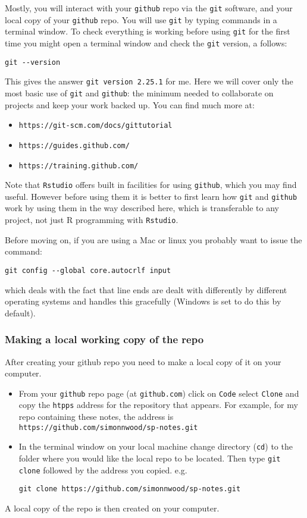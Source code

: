 \documentclass[10pt] {article}
\theoremstyle{definition}
\begin{document}
Mostly, you will interact with your {\tt github} repo via the {\tt git} software, and your local copy of your {\tt github} repo. You will use {\tt git} by typing commands in a terminal window. To check everything is working before using {\tt git} for the first time you might open a terminal window and check the {\tt git} version, a follows:
\begin{lstlisting}
git --version
\end{lstlisting}
This gives the answer \lstinline+git version 2.25.1+ for me. Here we will cover only the most basic use of {\tt git} and {\tt github}: the minimum needed to collaborate on projects and keep your work backed up. You can find much more at:
\begin{itemize}
\item \lstinline+https://git-scm.com/docs/gittutorial+
\item \lstinline+https://guides.github.com/+
\item \lstinline+https://training.github.com/+
\end{itemize}
Note that {\tt Rstudio} offers built in facilities for using {\tt github}, which you may find useful. However before using them it is better to first learn how {\tt git} and {\tt github} work by using them in the way described here, which is transferable to any project, not just R programming with {\tt Rstudio}.  

Before moving on, if you are using a Mac or linux you probably want to issue the command:
\begin{lstlisting}
git config --global core.autocrlf input
\end{lstlisting}
which deals with the fact that line ends are dealt with differently by different operating systems and handles this gracefully (Windows is set to do this by default).

\subsubsection{Making a local working copy of the repo}

After creating your github repo you need to make a local copy of it on your computer. 
\begin{itemize}
\item From your {\tt github} repo page (at {\tt github.com}) click on {\tt Code} select {\tt Clone} and copy the {\tt htpps} address for the repository that appears. For example, for my repo containing these notes, the address is \lstinline+https://github.com/simonnwood/sp-notes.git+
\item In the terminal window on your local machine change directory ({\tt cd}) to the folder where you would like the local repo to be located. Then type {\tt git clone} followed by the address you copied. e.g. 
\begin{lstlisting}
git clone https://github.com/simonnwood/sp-notes.git
\end{lstlisting}
\end{itemize}
A local copy of the repo is then created on your computer.  
\end{document}

